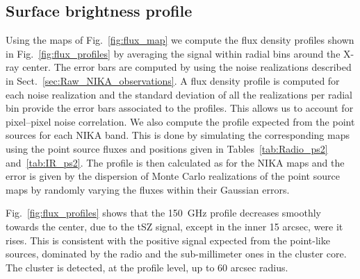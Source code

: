 \documentclass[twocolumn,traditabstract]{aa}
\begin{document}
\subsection{Surface brightness profile}\label{sec:surface_brightness_profiles_comparison}
Using the maps of Fig.~\ref{fig:flux_map} we compute the flux density profiles shown in Fig.~\ref{fig:flux_profiles} by averaging the signal within radial bins around the X-ray center. The error bars are computed by using the noise realizations described in Sect.~\ref{sec:Raw_NIKA_observations}. A flux density profile is computed for each noise realization and the standard deviation of all the realizations per radial bin provide the error bars associated to the profiles. This allows us to account for pixel--pixel noise correlation. We also compute the profile expected from the point sources for each NIKA band. This is done by simulating the corresponding maps using the point source fluxes and positions given in Tables~\ref{tab:Radio_ps2} and~\ref{tab:IR_ps2}. The profile is then calculated as for the NIKA maps and the error is given by the dispersion of Monte Carlo realizations of the point source maps by randomly varying the fluxes within their Gaussian errors.

Fig.~\ref{fig:flux_profiles} shows that the 150~GHz profile decreases smoothly towards the center, due to the tSZ signal, except in the inner 15 arcsec, were it rises. This is consistent with the positive signal expected from the point-like sources, dominated by the radio and the sub-millimeter ones in the cluster core. The cluster is detected, at the profile level, up to 60 arcsec radius. 
\end{document}
